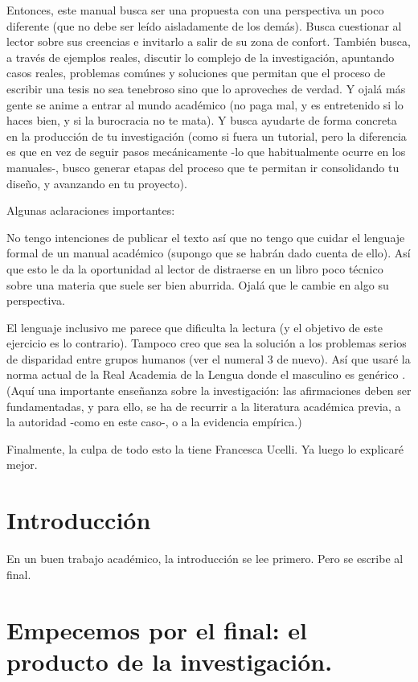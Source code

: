 \documentclass[
]{book}
\begin{document}
Entonces, este manual busca ser una propuesta con una perspectiva un poco diferente (que no debe ser leído aisladamente de los demás). Busca cuestionar al lector sobre sus creencias e invitarlo a salir de su zona de confort. También busca, a través de ejemplos reales, discutir lo complejo de la investigación, apuntando casos reales, problemas comúnes y soluciones que permitan que el proceso de escribir una tesis no sea tenebroso sino que lo aproveches de verdad. Y ojalá más gente se anime a entrar al mundo académico (no paga mal, y es entretenido si lo haces bien, y si la burocracia no te mata). Y busca ayudarte de forma concreta en la producción de tu investigación (como si fuera un tutorial, pero la diferencia es que en vez de seguir pasos mecánicamente -lo que habitualmente ocurre en los manuales-, busco generar etapas del proceso que te permitan ir consolidando tu diseño, y avanzando en tu proyecto).

Algunas aclaraciones importantes:

No tengo intenciones de publicar el texto así que no tengo que cuidar el lenguaje formal de un manual académico (supongo que se habrán dado cuenta de ello). Así que esto le da la oportunidad al lector de distraerse en un libro poco técnico sobre una materia que suele ser bien aburrida. Ojalá que le cambie en algo su perspectiva.

El lenguaje inclusivo me parece que dificulta la lectura (y el objetivo de este ejercicio es lo contrario). Tampoco creo que sea la solución a los problemas serios de disparidad entre grupos humanos (ver el numeral 3 de nuevo). Así que usaré la norma actual de la Real Academia de la Lengua donde el masculino es genérico \citep{rae}. (Aquí una importante enseñanza sobre la investigación: las afirmaciones deben ser fundamentadas, y para ello, se ha de recurrir a la literatura académica previa, a la autoridad -como en este caso-, o a la evidencia empírica.)

Finalmente, la culpa de todo esto la tiene Francesca Ucelli. Ya luego lo explicaré mejor.

\hypertarget{intro}{%
\chapter{Introducción}\label{intro}}

En un buen trabajo académico, la introducción se lee primero. Pero se escribe al final.

\hypertarget{empecemos-por-el-final-el-producto-de-la-investigaciuxf3n.}{%
\chapter{Empecemos por el final: el producto de la investigación.}\label{empecemos-por-el-final-el-producto-de-la-investigaciuxf3n.}}
\end{document}
